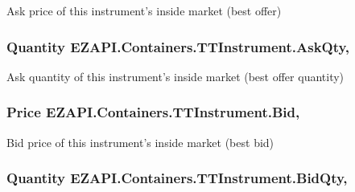 Ask price of this instrument's inside market (best offer) 

\hypertarget{class_e_z_a_p_i_1_1_containers_1_1_t_t_instrument_a027537695888a620318cf012281d421e}{
\subsubsection[{Ask\-Qty}]{\setlength{\rightskip}{0pt plus 5cm}Quantity E\-Z\-A\-P\-I.\-Containers.\-T\-T\-Instrument.\-Ask\-Qty\hspace{0.3cm}{\ttfamily [get]}, {\ttfamily [set]}}}\label{class_e_z_a_p_i_1_1_containers_1_1_t_t_instrument_a027537695888a620318cf012281d421e}


Ask quantity of this instrument's inside market (best offer quantity) 

\hypertarget{class_e_z_a_p_i_1_1_containers_1_1_t_t_instrument_ab339c987cd7ceeedaf2b4ec94cbc532a}{
\subsubsection[{Bid}]{\setlength{\rightskip}{0pt plus 5cm}Price E\-Z\-A\-P\-I.\-Containers.\-T\-T\-Instrument.\-Bid\hspace{0.3cm}{\ttfamily [get]}, {\ttfamily [set]}}}\label{class_e_z_a_p_i_1_1_containers_1_1_t_t_instrument_ab339c987cd7ceeedaf2b4ec94cbc532a}


Bid price of this instrument's inside market (best bid) 

\hypertarget{class_e_z_a_p_i_1_1_containers_1_1_t_t_instrument_a5e005c3504b652c6f117875195c03692}{
\subsubsection[{Bid\-Qty}]{\setlength{\rightskip}{0pt plus 5cm}Quantity E\-Z\-A\-P\-I.\-Containers.\-T\-T\-Instrument.\-Bid\-Qty\hspace{0.3cm}{\ttfamily [get]}, {\ttfamily [set]}}}\label{class_e_z_a_p_i_1_1_containers_1_1_t_t_instrument_a5e005c3504b652c6f117875195c03692}


